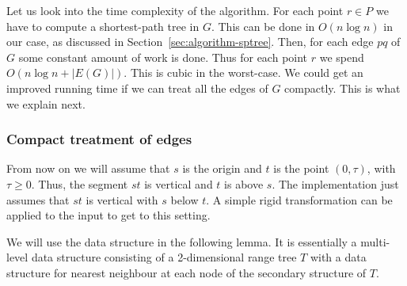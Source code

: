 \documentclass[a4paper,11pt]{article}
\let\ge\geqslant
\begin{document}
Let us look into the time complexity of the algorithm.
For each point $r\in P$ we have to compute a shortest-path tree in $G$.
This can be done in $O(n\log n)$ in our case, 
as discussed in Section~\ref{sec:algorithm-sptree}. 
Then, for each edge $pq$ of $G$ some constant amount of work is done.
Thus for each point $r$ we spend  
$O(n\log n+|E(G)|)$.
This is cubic in the worst-case.
We could get an improved running time if we can treat all the edges of $G$
compactly. This is what we explain next.


\subsubsection{Compact treatment of edges}
\label{sec:quadratic}

From now on we will assume that $s$ is the origin and 
$t$ is the point $(0,\tau)$, with $\tau\ge 0$. Thus, the segment $st$
is vertical and $t$ is above $s$. The implementation just
assumes that $st$ is vertical with $s$ below $t$. 
A simple rigid transformation can be applied to
the input to get to this setting.

We will use the data structure in the following lemma.
It is essentially a multi-level data structure consisting
of a 2-dimensional range tree $T$ with
a data structure for nearest neighbour at each node of the secondary structure
of $T$.
\end{document}
